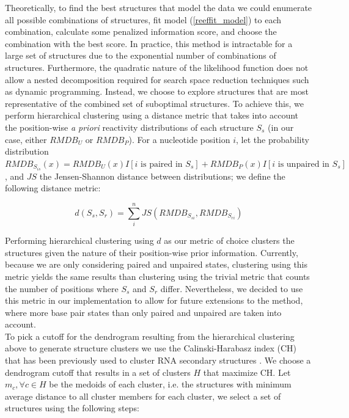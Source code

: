 \documentclass[12pt]{article}
\begin{document}
Theoretically, to find the best structures that model the data we could enumerate all possible combinations of structures, fit model (\ref{reeffit_model}) to each combination, calculate some penalized information score, and choose the combination with the best score. 
In practice, this method is intractable for a large set of structures due to the exponential number of combinations of structures. 
Furthermore, the quadratic nature of the likelihood function does not allow a nested decomposition required for search space reduction techniques such as dynamic programming. 
Instead, we choose to explore structures that are most representative of the combined set of suboptimal structures. 
To achieve this, we perform hierarchical clustering using a distance metric that takes into account the position-wise \textit{a priori} reactivity distributions of each structure $S_s$ (in our case, either $RMDB_U$ or $RMDB_P$). 
For a nucleotide position $i$, let the probability distribution $RMDB_{S_{is}}(x) = RMDB_U(x) I\left[i \mbox{ is paired in } S_s\right] + RMDB_P(x) I\left[i \mbox{ is unpaired in } S_s\right]$, and $JS$ the Jensen-Shannon distance between distributions; we define the following distance metric:

\[d(S_s, S_r) = \sum^n_i JS(RMDB_{S_{si}}, RMDB_{S_{ri}})\]

Performing hierarchical clustering using $d$ as our metric of choice clusters the structures given the nature of their position-wise prior information. 
Currently, because we are only considering paired and unpaired states, clustering using this metric yields the same results than clustering using the trivial metric that counts the number of positions where $S_s$ and $S_r$ differ. 
Nevertheless, we decided to use this metric in our implementation to allow for future extensions to the method, where more base pair states than only paired and unpaired are taken into account.\\
To pick a cutoff for the dendrogram resulting from the hierarchical clustering above to generate structure clusters we use the Calinski-Harabasz index (CH) that has been previously used to cluster RNA secondary structures \cite{Ding2005b}. 
We choose a dendrogram cutoff that results in a set of clusters $H$ that maximize CH. 
Let $m_c, \forall c \in H$ be the medoids of each cluster, i.e. the structures with minimum average distance to all cluster members for each cluster, we select a set of structures using the following steps:
\end{document}
